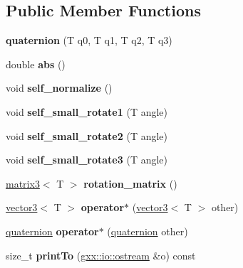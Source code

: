 \subsection*{Public Member Functions}
\begin{DoxyCompactItemize}
\item 
{\bfseries quaternion} (T q0, T q1, T q2, T q3)\hypertarget{classmalgo_1_1quaternion_af8a616a686737866ddfb14704f9c3652}{}\label{classmalgo_1_1quaternion_af8a616a686737866ddfb14704f9c3652}

\item 
double {\bfseries abs} ()\hypertarget{classmalgo_1_1quaternion_af42a5b7ef4a88a94ab79638b7e61ab23}{}\label{classmalgo_1_1quaternion_af42a5b7ef4a88a94ab79638b7e61ab23}

\item 
void {\bfseries self\+\_\+normalize} ()\hypertarget{classmalgo_1_1quaternion_a1099b5ef7a34f2407b0f7ed19d520d07}{}\label{classmalgo_1_1quaternion_a1099b5ef7a34f2407b0f7ed19d520d07}

\item 
void {\bfseries self\+\_\+small\+\_\+rotate1} (T angle)\hypertarget{classmalgo_1_1quaternion_a309b1f7ec46f65cc01a54533acc9728a}{}\label{classmalgo_1_1quaternion_a309b1f7ec46f65cc01a54533acc9728a}

\item 
void {\bfseries self\+\_\+small\+\_\+rotate2} (T angle)\hypertarget{classmalgo_1_1quaternion_a70e969d03dc7ffef2eabb8a753e3413b}{}\label{classmalgo_1_1quaternion_a70e969d03dc7ffef2eabb8a753e3413b}

\item 
void {\bfseries self\+\_\+small\+\_\+rotate3} (T angle)\hypertarget{classmalgo_1_1quaternion_a232aab682abebc7994354e198ab0036e}{}\label{classmalgo_1_1quaternion_a232aab682abebc7994354e198ab0036e}

\item 
\hyperlink{classmalgo_1_1matrix3}{matrix3}$<$ T $>$ {\bfseries rotation\+\_\+matrix} ()\hypertarget{classmalgo_1_1quaternion_adc647adac1a11d5351ccc2df79d0a7f0}{}\label{classmalgo_1_1quaternion_adc647adac1a11d5351ccc2df79d0a7f0}

\item 
\hyperlink{structmalgo_1_1vector3}{vector3}$<$ T $>$ {\bfseries operator$\ast$} (\hyperlink{structmalgo_1_1vector3}{vector3}$<$ T $>$ other)\hypertarget{classmalgo_1_1quaternion_ae8b0a1cc59760b468b5171b75cb685a4}{}\label{classmalgo_1_1quaternion_ae8b0a1cc59760b468b5171b75cb685a4}

\item 
\hyperlink{classmalgo_1_1quaternion}{quaternion} {\bfseries operator$\ast$} (\hyperlink{classmalgo_1_1quaternion}{quaternion} other)\hypertarget{classmalgo_1_1quaternion_aa78f115e5b771807299addb4657c0240}{}\label{classmalgo_1_1quaternion_aa78f115e5b771807299addb4657c0240}

\item 
size\+\_\+t {\bfseries print\+To} (\hyperlink{classgxx_1_1io_1_1ostream}{gxx\+::io\+::ostream} \&o) const \hypertarget{classmalgo_1_1quaternion_adafd686e46cd5c22d7778104fed7992d}{}\label{classmalgo_1_1quaternion_adafd686e46cd5c22d7778104fed7992d}

\end{DoxyCompactItemize}
